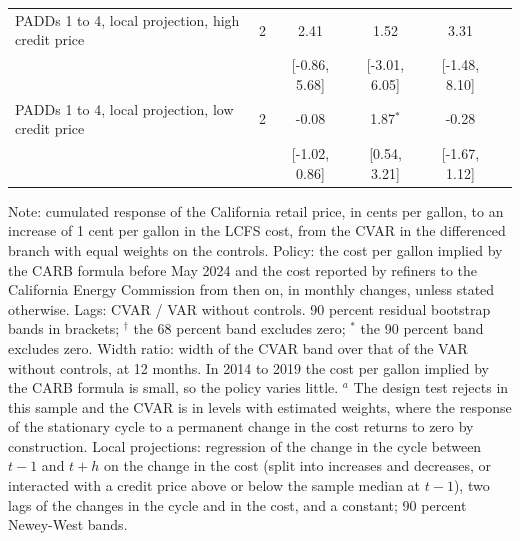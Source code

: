 \begin{table}[htbp]
\begin{tabular}{lccccc}
PADDs 1 to 4, local projection, high credit price & 2 & 2.41 & 1.52 & 3.31 &  \\
\footnotesize  &  & [-0.86, 5.68] & [-3.01, 6.05] & [-1.48, 8.10] &  \\[2pt]
PADDs 1 to 4, local projection, low credit price & 2 & -0.08 & 1.87$^{*}$ & -0.28 &  \\
\footnotesize  &  & [-1.02, 0.86] & [0.54, 3.21] & [-1.67, 1.12] &  \\[2pt]
\bottomrule
\end{tabular}
\begin{minipage}{0.95\textwidth}\footnotesize
Note: cumulated response of the California retail price, in cents per gallon, to an increase of 1 cent per gallon in the LCFS cost, from the CVAR in the differenced branch with equal weights on the controls. Policy: the cost per gallon implied by the CARB formula before May 2024 and the cost reported by refiners to the California Energy Commission from then on, in monthly changes, unless stated otherwise. Lags: CVAR / VAR without controls. 90 percent residual bootstrap bands in brackets; $^{\dagger}$ the 68 percent band excludes zero; $^{*}$ the 90 percent band excludes zero. Width ratio: width of the CVAR band over that of the VAR without controls, at 12 months. In 2014 to 2019 the cost per gallon implied by the CARB formula is small, so the policy varies little. $^{a}$ The design test rejects in this sample and the CVAR is in levels with estimated weights, where the response of the stationary cycle to a permanent change in the cost returns to zero by construction. Local projections: regression of the change in the cycle between $t-1$ and $t+h$ on the change in the cost (split into increases and decreases, or interacted with a credit price above or below the sample median at $t-1$), two lags of the changes in the cycle and in the cost, and a constant; 90 percent Newey-West bands.
\end{minipage}
\end{table}
